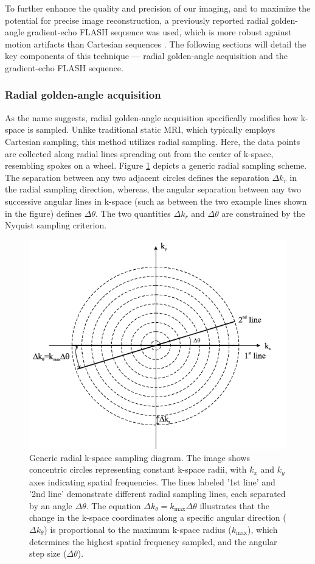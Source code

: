 \documentclass{micro-econ-thesis}
\begin{document}
  
To further enhance the quality and precision of our imaging, and to maximize the potential for precise image reconstruction, a previously reported radial golden-angle gradient-echo FLASH sequence was used, which is more robust against motion artifacts than Cartesian sequences \parencite{aleksiev_high-resolution_2022}. The following sections will detail the key components of this technique — radial golden-angle acquisition and the gradient-echo FLASH sequence.

\subsubsection{Radial golden-angle acquisition}


As the name suggests, radial golden-angle acquisition specifically modifies how k-space is sampled. Unlike traditional static MRI, which typically employs Cartesian sampling, this method utilizes radial sampling. Here, the data points are collected along radial lines spreading out from the center of k-space, resembling spokes on a wheel. Figure \ref{fig:radial} depicts a generic radial sampling scheme. The separation between any two adjacent circles defines the separation $\Delta k_r$ in the radial sampling direction, whereas, the angular separation between any two successive angular lines in k-space (such as between the two example lines shown in the figure) defines $\Delta \theta$. The two quantities $\Delta k_r$ and $\Delta \theta$ are constrained by the Nyquist sampling criterion. \parencite{brown_magnetic_2014} 
  
 \begin{figure}[H]
 	\centering
 	\includegraphics[width=0.7\linewidth]{radial}
 	\caption{Generic radial k-space sampling diagram. The image shows concentric circles representing constant k-space radii, with $k_x$ and $k_y$ axes indicating spatial frequencies. The lines labeled '1st line' and '2nd line' demonstrate different radial sampling lines, each separated by an angle $\Delta \theta$. The equation $\Delta k_{\theta} = k_{\text{max}} \Delta \theta$ illustrates that the change in the k-space coordinates along a specific angular direction ($\Delta k_{\theta}$) is proportional to the maximum k-space radius ($k_{\text{max}}$), which determines the highest spatial frequency sampled, and the angular step size ($\Delta \theta$).
 		 \parencite[p.306]{brown_magnetic_2014}}
 	\label{fig:radial}
 \end{figure}
 
\end{document}
